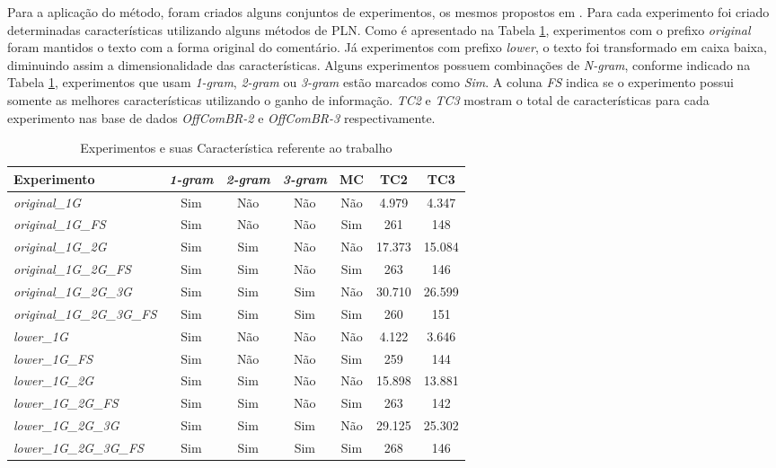 Para a aplicação do método, foram criados alguns conjuntos de experimentos, os mesmos propostos em \cite{Pelle2017}. Para cada experimento foi criado determinadas características utilizando alguns métodos de PLN. Como é apresentado na Tabela \ref{tab:proposta-base-dados-experimentos}, experimentos com o prefixo {\it original} foram mantidos o texto com a forma original do comentário. Já experimentos com prefixo {\it lower}, o texto foi transformado em caixa baixa, diminuindo assim a dimensionalidade das características. Alguns experimentos possuem combinações de {\it N-gram}, conforme indicado na Tabela \ref{tab:proposta-base-dados-experimentos}, experimentos que usam {\it 1-gram}, {\it 2-gram} ou {\it 3-gram} estão marcados como {\it Sim}. A coluna {\it FS} indica se o experimento possui somente as melhores características utilizando o ganho de informação. {\it TC2} e {\it TC3} mostram o total de características para cada experimento nas base de dados {\it OffComBR-2} e {\it OffComBR-3} respectivamente.     

\begin{table}[h]
    \centering
    {\renewcommand \arraystretch{1.25}
        \begin{tabular}{ l c c c c c c }
            \hline
            {\bf Experimento} & {\it \bf 1-gram } & {\it \bf 2-gram } & {\it \bf 3-gram } &
            {\bf MC } & {\bf TC2 } & {\bf TC3 } \\  
            \hline
            
            {\it original\_1G} & Sim & Não & Não & Não & 4.979 & 4.347 \\
            {\it original\_1G\_FS} & Sim & Não & Não & Sim & 261 & 148 \\
            {\it original\_1G\_2G} & Sim & Sim & Não & Não & 17.373 & 15.084 \\
            {\it original\_1G\_2G\_FS} & Sim & Sim & Não & Sim & 263 & 146 \\
            {\it original\_1G\_2G\_3G} & Sim & Sim & Sim & Não & 30.710 & 26.599 \\
            {\it original\_1G\_2G\_3G\_FS} & Sim &  Sim & Sim & Sim & 260 & 151 \\
            {\it lower\_1G} & Sim &  Não & Não & Não & 4.122 & 3.646 \\
            {\it lower\_1G\_FS} & Sim &  Não & Não & Sim & 259 & 144 \\
            {\it lower\_1G\_2G} & Sim &  Sim & Não & Não & 15.898 & 13.881 \\
            {\it lower\_1G\_2G\_FS} & Sim &  Sim & Não & Sim & 263 & 142 \\
            {\it lower\_1G\_2G\_3G} & Sim &  Sim & Sim & Não & 29.125 & 25.302 \\
            {\it lower\_1G\_2G\_3G\_FS} & Sim &  Sim & Sim & Sim & 268 & 146 \\
            \hline
        \end{tabular} 
    }
    \caption{Experimentos e suas Característica referente ao trabalho \cite{Pelle2017}}\label{tab:proposta-base-dados-experimentos}
\end{table}

